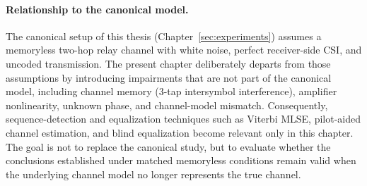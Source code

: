 \paragraph{Relationship to the canonical model.} The canonical setup of this thesis (Chapter~\ref{sec:experiments}) assumes a memoryless two-hop relay channel with white noise, perfect receiver-side CSI, and uncoded transmission. The present chapter deliberately departs from those assumptions by introducing impairments that are not part of the canonical model, including channel memory (3-tap intersymbol interference), amplifier nonlinearity, unknown phase, and channel-model mismatch. Consequently, sequence-detection and equalization techniques such as Viterbi MLSE, pilot-aided channel estimation, and blind equalization become relevant only in this chapter. The goal is not to replace the canonical study, but to evaluate whether the conclusions established under matched memoryless conditions remain valid when the underlying channel model no longer represents the true channel.

